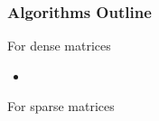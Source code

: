 \begin{frame}
  \frametitle{Algorithms Outline}
  \begin{block}{For dense matrices}
    \begin{itemize}
      \item 
    \end{itemize}
  \end{block}
  \begin{block}{For sparse matrices}
  \end{block}
\end{frame}
